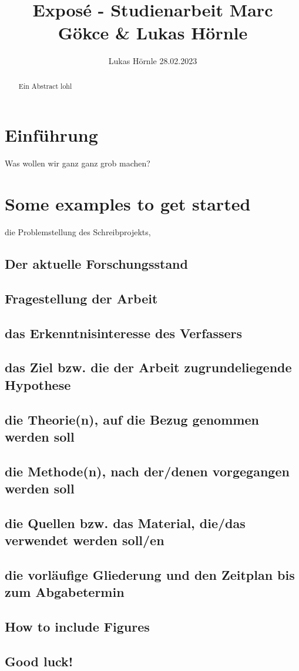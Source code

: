 \documentclass{article}
\title{Exposé - Studienarbeit Marc Gökce & Lukas Hörnle}
\author{Lukas Hörnle 28.02.2023}
\begin{document}
\maketitle

\begin{abstract}
Ein Abstract lohl
\end{abstract}

\section{Einführung}
Was wollen wir ganz ganz grob machen? 
\section{Some examples to get started}
 die Problemstellung des Schreibprojekts,
\subsection{Der aktuelle Forschungsstand}
\subsection{Fragestellung der Arbeit}
\subsection{das Erkenntnisinteresse des Verfassers}
\subsection{das Ziel bzw. die der Arbeit zugrundeliegende Hypothese}
\subsection{die Theorie(n), auf die Bezug genommen werden soll}
\subsection{die Methode(n), nach der/denen vorgegangen werden soll}
\subsection{die Quellen bzw. das Material, die/das verwendet werden soll/en}
\subsection{die vorläufige Gliederung und den Zeitplan bis zum Abgabetermin}
\subsection{How to include Figures}
\subsection{Good luck!}
\end{document}
